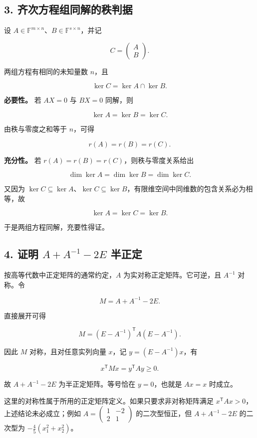 \documentclass[11pt,fontset=fandol]{ctexart}
\begin{document}
\subsection{3.
齐次方程组同解的秩判据}\label{ux9f50ux6b21ux65b9ux7a0bux7ec4ux540cux89e3ux7684ux79e9ux5224ux636e}

设 \(A\in\mathbb F^{m\times n}\)、\(B\in\mathbb F^{s\times n}\)，并记

\[
C=\begin{pmatrix}A\\B\end{pmatrix}.
\]

两组方程有相同的未知量数 \(n\)，且

\[
\ker C=\ker A\cap\ker B.
\]

\textbf{必要性。} 若 \(AX=0\) 与 \(BX=0\) 同解，则

\[
\ker A=\ker B=\ker C.
\]

由秩与零度之和等于 \(n\)，可得

\[
r(A)=r(B)=r(C).
\]

\textbf{充分性。} 若 \(r(A)=r(B)=r(C)\)，则秩与零度关系给出

\[
\dim\ker A=\dim\ker B=\dim\ker C.
\]

又因为
\(\ker C\subseteq\ker A\)、\(\ker C\subseteq\ker B\)，有限维空间中同维数的包含关系必为相等，故

\[
\ker A=\ker C=\ker B.
\]

于是两组方程同解，充要性得证。

\subsection{\texorpdfstring{4. 证明 \(A+A^{-1}-2E\)
半正定}{4. 证明 A+A\^{}\{-1\}-2E 半正定}}\label{ux8bc1ux660e-aa-1-2e-ux534aux6b63ux5b9a}

按高等代数中正定矩阵的通常约定，\(A\) 为实对称正定矩阵。它可逆，且
\(A^{-1}\) 对称。令

\[
M=A+A^{-1}-2E.
\]

直接展开可得

\[
M=(E-A^{-1})^{\mathsf T}A(E-A^{-1}).
\]

因此 \(M\) 对称，且对任意实列向量 \(x\)，记 \(y=(E-A^{-1})x\)，有

\[
x^{\mathsf T}Mx=y^{\mathsf T}Ay\ge0.
\]

故 \(\boxed{A+A^{-1}-2E\text{ 为半正定矩阵}}\)。等号恰在 \(y=0\)，也就是
\(Ax=x\) 时成立。

这里的对称性属于所用的正定矩阵定义。如果只要求非对称矩阵满足
\(x^{\mathsf T}Ax>0\)，上述结论未必成立；例如
\(A=\begin{pmatrix}1&-2\\2&1\end{pmatrix}\) 的二次型恒正，但
\(A+A^{-1}-2E\) 的二次型为 \(-\frac45(x_1^2+x_2^2)\)。
\end{document}
